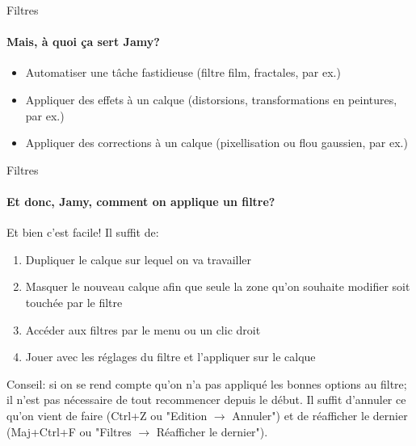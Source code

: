 \documentclass[10pt,svgnames,usenames,table]{beamer}
\begin{document}
	\begin{frame}{Filtres}
		\framesubtitle{Mais, à quoi ça sert Jamy?}
			\begin{itemize}
			\item Automatiser une tâche fastidieuse (filtre film, fractales, par ex.)
			\item Appliquer des effets à un calque (distorsions, transformations en peintures, par ex.)
			\item Appliquer des corrections à un calque (pixellisation ou flou gaussien, par ex.)
			\end{itemize}			
	\end{frame}	

	\begin{frame}{Filtres}
		\framesubtitle{Et donc, Jamy, comment on applique un filtre?}	
		Et bien c'est facile! Il suffit de: 
		\begin{enumerate}
			\item Dupliquer le calque sur lequel on va travailler
			\item Masquer le nouveau calque afin que seule la zone qu'on souhaite modifier soit touchée par le filtre
			\item Accéder aux filtres par le menu ou un clic droit
			\item Jouer avec les réglages du filtre et l'appliquer sur le calque
		\end{enumerate}

		Conseil: si on se rend compte qu'on n'a pas appliqué les bonnes options au filtre; il n'est pas nécessaire de tout recommencer depuis le début. Il suffit d'annuler ce qu'on vient de faire (Ctrl+Z ou "Edition $\rightarrow$ Annuler") et de réafficher le dernier (Maj+Ctrl+F ou "Filtres $\rightarrow$ Réafficher le dernier").	
	
	\end{frame}
\end{document}
